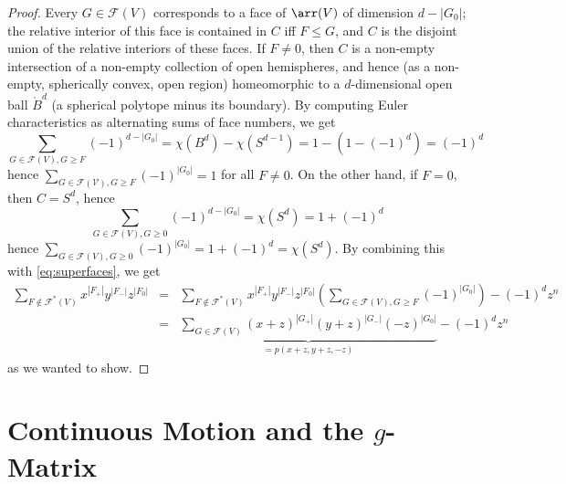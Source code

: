 \begin{proof}
Every $G\in \mathcal{F}(V)$ corresponds to a face of $\arr(V)$ of dimension $d-|G_0|$; the relative interior of this face is contained in $C$ iff $F\leq G$, and $C$ is the disjoint union of the relative interiors of these faces. 
%
If $F\neq 0$, then $C$ is a non-empty intersection of a non-empty collection of open hemispheres, and hence (as a non-empty, spherically convex, open region) homeomorphic to a $d$-dimensional open ball $\mathring{B}^d$ (a spherical polytope minus its boundary). By computing Euler characteristics as alternating sums of face numbers, we get
\[
\sum_{G\in \mathcal{F}(V), G\geq F} (-1)^{d-|G_0|}=\chi(B^d)-\chi(S^{d-1})=1-(1-(-1)^d)=(-1)^d
\]
hence $\sum_{G\in \mathcal{F(V)}, G\geq F}(-1)^{|G_0|}=1$ for all $F\neq 0$. 
%
On the other hand, if $F = 0$, then $C=S^d$, hence
\[
\sum_{G\in \mathcal{F}(V), G\geq 0} (-1)^{d-|G_0|}=\chi(S^d)=1+(-1)^d
\]
hence $\sum_{G\in \mathcal{F}(V), G\geq 0}(-1)^{|G_0|}=1+(-1)^d=\chi(S^d)$.
By combining this with \eqref{eq:superfaces}, we get
\begin{eqnarray*}
\sum_{F \not\in \mathcal{F}^*(V)} x^{|F_+|} y^{|F_-|} z^{|F_0|} &= & \sum_{F \not\in \mathcal{F}^*(V)} x^{|F_+|} y^{|F_-|} z^{|F_0|}\left( \sum_{G\in \mathcal{F}(V), G\geq F} (-1)^{|G_0|} \right)-(-1)^d z^n \\
&= & \underbrace{\sum_{G\in \mathcal{F}(V)} (x+z)^{|G_+|} (y+z)^{|G_-|} (-z)^{|G_0|}}_{=p(x+z,y+z,-z)}-(-1)^d z^n
\end{eqnarray*}
as we wanted to show.
\end{proof}
%
\section{Continuous Motion and the $g$-Matrix}
\label{sec:g-matrix}
%
